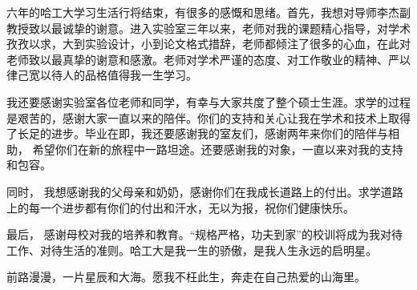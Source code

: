 \begin{acknowledgements}
六年的哈工大学习生活行将结束，有很多的感慨和思绪。首先，我想对导师李杰副教授致以最诚挚的谢意。进入实验室三年以来，老师对我的课题精心指导，对学术孜孜以求，大到实验设计，小到论文格式措辞，老师都倾注了很多的心血，在此对老师致以最真挚的谢意和感激。老师对学术严谨的态度、对工作敬业的精神、严以律己宽以待人的品格值得我一生学习。


我还要感谢实验室各位老师和同学，有幸与大家共度了整个硕士生涯。求学的过程是艰苦的，感谢大家一直以来的陪伴。你们的支持和关心让我在学术和技术上取得了长足的进步。毕业在即，我还要感谢我的室友们，感谢两年来你们的陪伴与相助， 希望你们在新的旅程中一路坦途。还要感谢我的对象，一直以来对我的支持和包容。

同时， 我想感谢我的父母亲和奶奶，感谢你们在我成长道路上的付出。求学道路上的每一个进步都有你们的付出和汗水，无以为报，祝你们健康快乐。

最后， 感谢母校对我的培养和教育。“规格严格，功夫到家”的校训将成为我对待工作、对待生活的准则。哈工大是我一生的骄傲，是我人生永远的启明星。

前路漫漫，一片星辰和大海。愿我不枉此生，奔走在自己热爱的山海里。
\end{acknowledgements}
